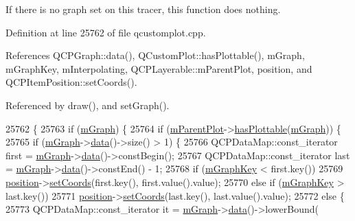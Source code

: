 If there is no graph set on this tracer, this function does nothing. 

Definition at line 25762 of file qcustomplot.\+cpp.



References Q\+C\+P\+Graph\+::data(), Q\+Custom\+Plot\+::has\+Plottable(), m\+Graph, m\+Graph\+Key, m\+Interpolating, Q\+C\+P\+Layerable\+::m\+Parent\+Plot, position, and Q\+C\+P\+Item\+Position\+::set\+Coords().



Referenced by draw(), and set\+Graph().


\begin{DoxyCode}
25762                                    \{
25763   \textcolor{keywordflow}{if} (\hyperlink{class_q_c_p_item_tracer_a2d70cf616b579563aa15f796dfc143ac}{mGraph}) \{
25764     \textcolor{keywordflow}{if} (\hyperlink{class_q_c_p_layerable_aa2a528433e44db02b8aef23c1f9f90ed}{mParentPlot}->\hyperlink{class_q_custom_plot_a4fc28914e2ee91aab424b7ce46b6bdf1}{hasPlottable}(\hyperlink{class_q_c_p_item_tracer_a2d70cf616b579563aa15f796dfc143ac}{mGraph})) \{
25765       \textcolor{keywordflow}{if} (\hyperlink{class_q_c_p_item_tracer_a2d70cf616b579563aa15f796dfc143ac}{mGraph}->\hyperlink{class_q_c_p_graph_a2f58436df4f86a2792b776a21642b3d9}{data}()->size() > 1) \{
25766         QCPDataMap::const\_iterator first = \hyperlink{class_q_c_p_item_tracer_a2d70cf616b579563aa15f796dfc143ac}{mGraph}->\hyperlink{class_q_c_p_graph_a2f58436df4f86a2792b776a21642b3d9}{data}()->constBegin();
25767         QCPDataMap::const\_iterator last = \hyperlink{class_q_c_p_item_tracer_a2d70cf616b579563aa15f796dfc143ac}{mGraph}->\hyperlink{class_q_c_p_graph_a2f58436df4f86a2792b776a21642b3d9}{data}()->constEnd() - 1;
25768         \textcolor{keywordflow}{if} (\hyperlink{class_q_c_p_item_tracer_a8fa20f2e9ee07d21fd7c8d30ba4702ca}{mGraphKey} < first.key())
25769           \hyperlink{class_q_c_p_item_tracer_a69917e2fdb2b3a929c196958feee7cbe}{position}->\hyperlink{class_q_c_p_item_position_aa988ba4e87ab684c9021017dcaba945f}{setCoords}(first.key(), first.value().value);
25770         \textcolor{keywordflow}{else} \textcolor{keywordflow}{if} (\hyperlink{class_q_c_p_item_tracer_a8fa20f2e9ee07d21fd7c8d30ba4702ca}{mGraphKey} > last.key())
25771           \hyperlink{class_q_c_p_item_tracer_a69917e2fdb2b3a929c196958feee7cbe}{position}->\hyperlink{class_q_c_p_item_position_aa988ba4e87ab684c9021017dcaba945f}{setCoords}(last.key(), last.value().value);
25772         \textcolor{keywordflow}{else} \{
25773           QCPDataMap::const\_iterator it = \hyperlink{class_q_c_p_item_tracer_a2d70cf616b579563aa15f796dfc143ac}{mGraph}->\hyperlink{class_q_c_p_graph_a2f58436df4f86a2792b776a21642b3d9}{data}()->lowerBound(

\end{DoxyCode}
